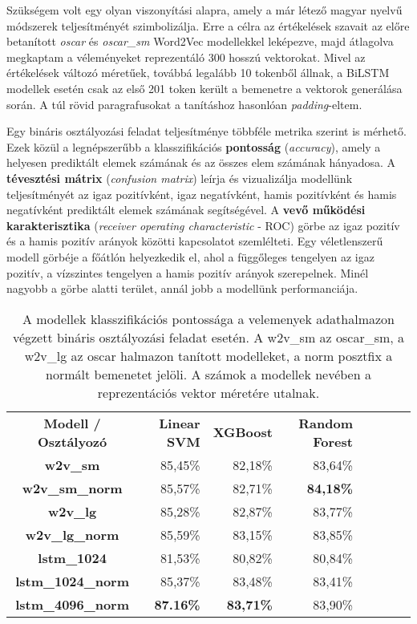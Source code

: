 Szükségem volt egy olyan viszonyítási alapra, amely a már létező magyar nyelvű módszerek teljesítményét szimbolizálja. Erre a célra az értékelések szavait az előre betanított \textit{oscar} és \textit{oscar\_sm} Word2Vec modellekkel leképezve, majd átlagolva megkaptam a véleményeket reprezentáló 300 hosszú vektorokat. Mivel az értékelések változó méretűek, továbbá legalább 10 tokenből állnak, a BiLSTM modellek esetén csak az első 201 token került a bemenetre a vektorok generálása során. A túl rövid paragrafusokat a tanításhoz hasonlóan \textit{padding}-eltem.

Egy bináris osztályozási feladat teljesítménye többféle metrika szerint is mérhető. Ezek közül a legnépszerűbb a klasszifikációs \textbf{pontosság} (\textit{accuracy}), amely a helyesen prediktált elemek számának és az összes elem számának hányadosa. A \textbf{tévesztési mátrix} (\textit{confusion matrix}) leírja és vizualizálja modellünk teljesítményét az igaz pozitívként, igaz negatívként, hamis pozitívként és hamis negatívként prediktált elemek számának segítségével. A \textbf{vevő működési karakterisztika} (\textit{receiver operating characteristic} - ROC) görbe az igaz pozitív és a hamis pozitív arányok közötti kapcsolatot szemlélteti. Egy véletlenszerű modell görbéje a főátlón helyezkedik el, ahol a függőleges tengelyen az igaz pozitív, a vízszintes tengelyen a hamis pozitív arányok szerepelnek. Minél nagyobb a görbe alatti terület, annál jobb a modellünk performanciája.

\begin{table}[H]
	\centering
	\begin{tabular}{ | c | r | r | r | r | r | r | r |}
		\hline
		\multirow{2}{*}{\textbf{Modell / Osztályozó}} & \multirow{2}{*}{\textbf{Linear SVM}} & \multirow{2}{*}{\textbf{XGBoost}} & \multirow{2}{*}{\textbf{Random Forest}} \\
		& & & \\
		\hline \hline		
		\textbf{w2v\_sm} & 85,45\% & 82,18\% & 83,64\% \\
		\hline
		\textbf{w2v\_sm\_norm} & 85,57\% & 82,71\% & \textbf{84,18\%} \\
		\hline
		\textbf{w2v\_lg} & 85,28\% & 82,87\% & 83,77\% \\
		\hline
		\textbf{w2v\_lg\_norm} & 85,59\% & 83,15\% & 83,85\% \\
		\hline  
		\textbf{lstm\_1024} & 81,53\% & 80,82\% & 80,84\% \\
		\hline  
		\textbf{lstm\_1024\_norm} & 85,37\% & 83,48\% & 83,41\% \\
		\hline
		\textbf{lstm\_4096\_norm} & \textbf{87.16\%} & \textbf{83,71\%} & 83,90\% \\
		\hline
	\end{tabular}
	\caption[A modellek pontossága]{A modellek klasszifikációs pontossága a velemenyek adathalmazon végzett bináris osztályozási feladat esetén. A w2v\_sm az oscar\_sm, a w2v\_lg az oscar halmazon tanított modelleket, a norm posztfix a normált bemenetet jelöli. A számok a modellek nevében a reprezentációs vektor méretére utalnak.}
	\label{tab:evaluation}
\end{table}


